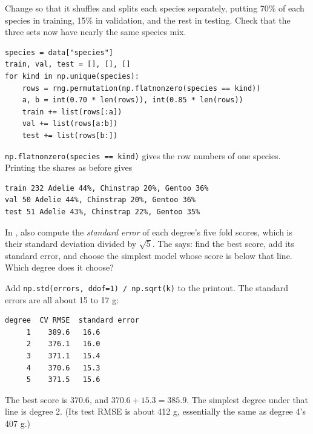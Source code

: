 \begin{Exercise}[label=tvt5, title=A stratified split]
Change  so that it shuffles and splits each species separately, putting 70\% of each
species in training, 15\% in validation, and the rest in testing. Check that the three sets now have nearly
the same species mix.
\end{Exercise}
\begin{Answer}[ref=tvt5]
\begin{verbatim}
species = data["species"]
train, val, test = [], [], []
for kind in np.unique(species):
    rows = rng.permutation(np.flatnonzero(species == kind))
    a, b = int(0.70 * len(rows)), int(0.85 * len(rows))
    train += list(rows[:a])
    val += list(rows[a:b])
    test += list(rows[b:])
\end{verbatim}
\verb|np.flatnonzero(species == kind)| gives the row numbers of one species. Printing the shares as before gives
\begin{verbatim}
train 232 Adelie 44%, Chinstrap 20%, Gentoo 36%
val 50 Adelie 44%, Chinstrap 20%, Gentoo 36%
test 51 Adelie 43%, Chinstrap 22%, Gentoo 35%
\end{verbatim}
\end{Answer}

\begin{Exercise}[label=tvt6, title={The one-standard-error rule}]
In , also compute the \emph{standard error} of each degree's five fold scores, which is
their standard deviation divided by $\sqrt{5}$. The  says: find the best score, add its standard error, and choose the simplest model whose score is below
that line. Which degree does it choose?
\end{Exercise}
\begin{Answer}[ref=tvt6]
Add \verb|np.std(errors, ddof=1) / np.sqrt(k)| to the printout. The standard errors are all about 15 to 17 g:
\begin{verbatim}
degree  CV RMSE  standard error
     1    389.6   16.6
     2    376.1   16.0
     3    371.1   15.4
     4    370.6   15.3
     5    371.5   15.6
\end{verbatim}
The best score is $370.6$, and $370.6 + 15.3 = 385.9$. The simplest degree under that line is degree 2. (Its
test RMSE is about 412 g, essentially the same as degree 4's 407 g.)
\end{Answer}
